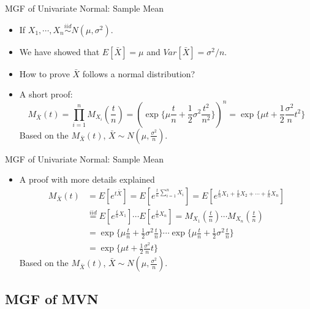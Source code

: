 \documentclass[
  ignorenonframetext,
]{beamer}
\providecommand{\tightlist}{%
  \setlength{\itemsep}{0pt}\setlength{\parskip}{0pt}}
\begin{document}
\begin{frame}{MGF of Univariate Normal: Sample Mean}
\protect\hypertarget{mgf-of-univariate-normal-sample-mean}{}
\begin{itemize}
\tightlist
\item
  If \(X_1, \cdots, X_n \overset{iid}\sim N(\mu, \sigma^2)\).
\item
  We have showed that \(E[\bar X]=\mu\) and \(Var[\bar X]=\sigma^2/n\).
\item
  How to prove \(\bar X\) follows a normal distribution?
\item
  A short proof: \[
  M_{\bar{X}}(t) = \prod_{i=1}^{n} M_{X_i}(\frac{t}{n})= \left(\exp\{\mu\frac{t}{n} + \frac{1}{2}\sigma^2 \frac{t^2}{n^2}\}\right)^n
  =\exp\{\mu t + \frac{1}{2}\frac{\sigma^2}{n}t^2 \}
  \] Based on the \(M_{\bar X}(t)\),
  \(\bar X\sim N(\mu, \frac{\sigma^2}{n})\).
\end{itemize}
\end{frame}

\begin{frame}{MGF of Univariate Normal: Sample Mean}
\protect\hypertarget{mgf-of-univariate-normal-sample-mean-1}{}
\begin{itemize}
\tightlist
\item
  A proof with more details explained \[
  \begin{aligned}
  M_{\bar X}(t)&=E[e^{t\bar X}]= E[e^{\frac{t}{n} \sum_{i=1}^n X_i}]=E[e^{\frac{t}{n} X_1 + \frac{t}{n} X_2 + \cdots + \frac{t}{n} X_n}]\\
  &\overset{iid}=E[e^{\frac{t}{n} X_1}]\cdots E[e^{\frac{t}{n} X_n}]=M_{X_1}(\frac{t}{n}) \cdots M_{X_n}(\frac{t}{n})\\
  &= \exp\{\mu\frac{t}{n}+\frac{1}{2}\sigma^2 \frac{t}{n}\}\cdots \exp\{\mu\frac{t}{n}+\frac{1}{2}\sigma^2 \frac{t}{n}\}\\
  &= \exp\{\mu t + \frac{1}{2}\frac{\sigma^2}{n}t\}
  \end{aligned}
  \] Based on the \(M_{\bar X}(t)\),
  \(\bar X\sim N(\mu, \frac{\sigma^2}{n})\).
\end{itemize}
\end{frame}

\hypertarget{mgf-of-mvn}{%
\subsection{MGF of MVN}\label{mgf-of-mvn}}
\end{document}
